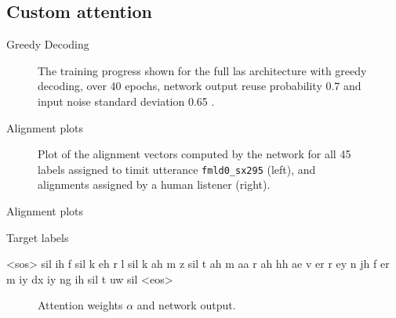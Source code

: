 \documentclass{beamer}
\begin{document}
\subsection{Custom attention}

\begin{frame}{Greedy Decoding}
	\begin{figure}
	
	
	\caption{The training progress shown for the full las architecture with greedy decoding, over 40 epochs, network output reuse probability 0.7 and input noise standard deviation 0.65 .}
	\label{fig:lasGreedy}
	\end{figure}
\end{frame}

\begin{frame}{Alignment plots}
	\begin{figure}
	\centering
	
	
	\caption{Plot of the alignment vectors computed by the network for all 45 labels assigned to timit utterance \texttt{fmld0\_sx295} (left), and alignments assigned by a human listener (right).}
	\label{fig:fullAttention}
	\end{figure}
\end{frame}

\begin{frame}{Alignment plots}
	\begin{block}{Target labels}
		\begin{semiverbatim}
		<sos>  sil  ih  f  sil  k  eh  r  l  sil  k  ah  m  z
		       sil  t  ah  m  aa  r  ah  hh  ae  v  er  r  ey
		       n  jh  f  er  m  iy  dx  iy  ng  ih  
		       sil  t  uw  sil
		<eos>
		\end{semiverbatim}
	\end{block}

	\begin{figure}
	\centering
	
	
	
	\caption{Attention weights $\alpha$ and network output.}
	\label{fig:attention3}
	\end{figure}
\end{frame}
\end{document}
